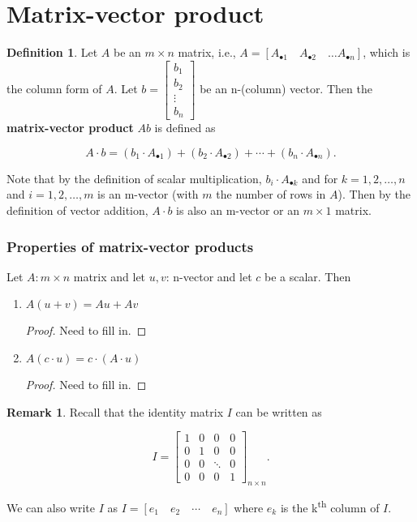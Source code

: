 \documentclass[12pt]{article}
\theoremstyle{definition}
\newtheorem*{definition}{Definition}
\newtheorem*{remark}{Remark}
\begin{document}
\section{Matrix-vector product}

\begin{definition}
Let $A$ be an $m \times n$ matrix, i.e., 
$A = [A_{\bullet 1} \quad A_{\bullet 2} \quad \ldots A_{\bullet n}]$, which is 
the column form of $A$. Let $b = \begin{bmatrix} b_1 \\ b_2 \\ \vdots \\ b_n \end{bmatrix}$
be an n-(column) vector. Then the \textbf{matrix-vector product} $Ab$ is defined as

\[
A \cdot b = (b_1 \cdot A_{\bullet 1}) + (b_2 \cdot A_{\bullet 2}) + \cdots + (b_n \cdot A_{\bullet n}).
\]

Note that by the definition of scalar multiplication, $b_i \cdot A_{\bullet k}$ and
for $k = 1, 2, \ldots, n$ and $i = 1, 2, \ldots, m$ 
is an m-vector (with $m$ the number of rows in $A$). Then by the definition
of vector addition, $A \cdot b$ is also an m-vector or an $m \times 1$ matrix.
\end{definition}

\subsubsection{Properties of matrix-vector products}

Let $A: m \times n$ matrix and let $u, v$: n-vector and let $c$ be a scalar. Then

\begin{enumerate}
\item $A(u + v) = Au + Av$
\begin{proof}
Need to fill in.
\end{proof}

\item $A(c \cdot u) = c \cdot (A \cdot u)$
\begin{proof}
Need to fill in.
\end{proof}
\end{enumerate}

\begin{remark}
Recall that the identity matrix $I$ can be written as

\[
I =
\begin{bmatrix}
1 & 0 & 0 & 0\\
0 & 1 & 0 & 0\\
0 & 0 & \ddots & 0 \\
0& 0 & 0 & 1
\end{bmatrix}_{n \times n}.
\]

We can also write $I$ as $I = [e_1 \quad e_2 \quad \cdots \quad e_n]$ where $e_k$ is the k\textsuperscript{th}
column of $I$.
\end{remark}
\end{document}
